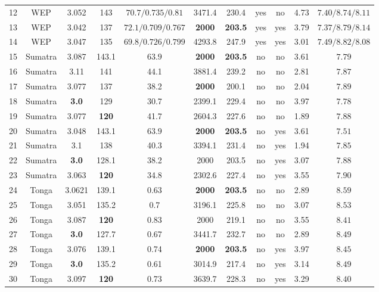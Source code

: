 \documentclass[12pt]{article}
\begin{document}
{\begin{table}
\begin{table}[H]
{\begin{tabular}{c c c c c c c c c c c }
         12 &WEP& 3.052 & 143 & $70.7/0.735/0.81$ & 3471.4 & 230.4 & yes  &no & 4.73 &$7.40/8.74/8.11$ \\
         13 &WEP& 3.042 & 137 & $72.1/0.709/0.767$ & \textbf{2000} & \textbf{203.5} & yes  &yes & 3.79 &$7.37/8.79/8.14$ \\
         14 &WEP& 3.047 & 135 & $69.8/0.726/0.799$ & 4293.8 & 247.9 & yes  &yes &3.01 &$7.49/8.82/8.08$ \\
         15 &Sumatra& 3.087 & 143.1 & $63.9$ &  \textbf{2000}& \textbf{203.5}& no &no &3.61 & $7.79$    \\
         16 &Sumatra& 3.11 & 141 & 44.1 & 3881.4 & 239.2   &no &no &2.81 & $7.87$ \\
         17 &Sumatra& 3.077 & 137 & 38.2 & \textbf{2000} & 200.1   &no &no &2.04 &$7.89$\\ 
         18 &Sumatra& \textbf{3.0} & 129 & 30.7 & 2399.1 & 229.4   &no &no &3.97 &$7.78$ \\
         19 &Sumatra& 3.077 & \textbf{120} & 41.7 & 2604.3 & 227.6   &no &no &1.89 &$7.88$   \\
         20 &Sumatra& 3.048 & 143.1 & $63.9$ &  \textbf{2000}& \textbf{203.5}& no &yes &3.61 &$7.51$    \\
         21 &Sumatra& 3.1 & 138 & 40.3 & 3394.1 & 231.4   &no &yes &1.94 &$7.85$  \\
         22 &Sumatra& \textbf{3.0} & 128.1 & 38.2 & 2000 & 203.5   &no &yes &3.07 &$7.88$  \\
         23  &Sumatra& 3.063 & \textbf{120} & 34.8 & 2302.6& 227.4   &no &yes &3.55 & $7.90$ \\
         24&Tonga  & 3.0621 & 139.1 & 0.63 & \textbf{2000} & \textbf{203.5} &no &no &2.89 & $8.59$ \\             
         25 &Tonga  & 3.051 & 135.2 & 0.7& 3196.1 & 225.8 &no &no &3.07& $8.53$ \\             
          26 &Tonga  & 3.087 &  \textbf{120} & 0.83 & 2000 &219.1  &no &no &3.55 & $8.41$\\              
          27 &Tonga  & \textbf{3.0}  & 127.7 & 0.67 & 3441.7 &232.7  &no &no &2.89 & $8.49$ \\             
          28 &Tonga  & 3.076 & 139.1 & 0.74& \textbf{2000} & \textbf{203.5} &no &yes &3.97 &$8.45$  \\          
           29 &Tonga  & \textbf{3.0} & 135.2 & 0.61& 3014.9 & 217.4 &no &yes &3.14 &$8.49$ \\             
          30&Tonga  & 3.097 &  \textbf{120} & 0.73 &3639.7 &228.3  &no &yes &3.29& $8.40$  \\             

\end{tabular}}
\end{table}
\end{table}}
\end{document}
